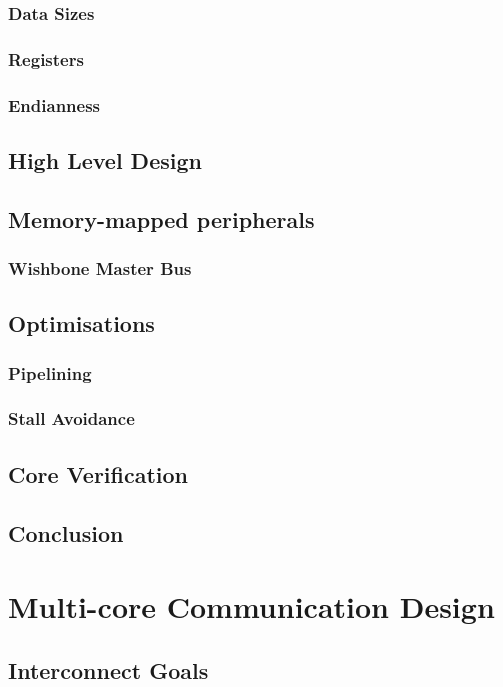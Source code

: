 \documentclass[11pt,a4paper]{report}
\begin{document}
{        \subsection{Data Sizes}
        \subsection{Registers}
        \subsection{Endianness}
    \section{High Level Design}
    \section{Memory-mapped peripherals}
        \subsection{Wishbone Master Bus}
    \section{Optimisations}
        \subsection{Pipelining}
        \subsection{Stall Avoidance}
    \section{Core Verification}
    \section{Conclusion}
        
\chapter{Multi-core Communication Design}
{\hypersetup{linkcolor=black}
\startcontents[chapters]
}
    \section{Interconnect Goals}
}
\end{document}
